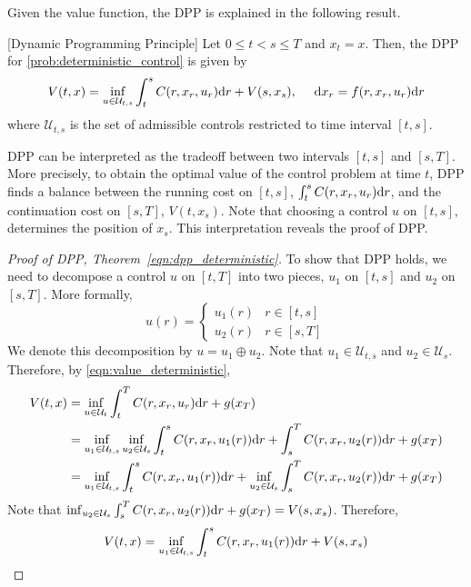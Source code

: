 \documentclass[11pt]{book}
\newcommand{\dr}{\text{\normalfont d}r}
\newcommand{\dx}{\text{\normalfont d}x}
\begin{document}
Given the value function, the DPP is explained in the following result.
\begin{thm}\label{thm:dpp_deterministic}
    [Dynamic Programming Principle]
    Let $0\le t<s\le T$ and $x_t=x$. Then, the DPP for \eqref{prob:deterministic_control} is given by 
    \begin{equation} \label{eqn:dpp_deterministic}
    V(t,x) =\inf_{u\in\mathcal{U}_{t,s}}\int_t^sC(r,x_r,u_r){{\dr}}+V(s,x_s),~~~~{\dx}_r=f(r,x_r,u_r){{\dr}}
\end{equation}
where $\mathcal{U}_{t,s}$ is the set of admissible controls restricted to time interval $[t,s]$.
\end{thm}
DPP can be interpreted as the tradeoff between two intervals $[t,s]$ and $[s,T]$. More precisely, to obtain the optimal value of the control problem at time $t$, DPP finds a balance between the running cost on $[t,s]$, $\int_t^sC(r,x_r,u_r){{\dr}}$, and the continuation cost on $[s,T]$, $V(t,x_s)$. Note that choosing a control $u$ on $[t,s]$, determines the position of $x_s$.
This interpretation reveals the proof of DPP.
\begin{proof}
    [Proof of DPP, Theorem~\ref{eqn:dpp_deterministic}]
    To show that DPP holds, we need to decompose a control $u$ on $[t,T]$ into two pieces, $u_1$ on $[t,s]$ and $u_2$ on $[s,T]$. More formally,
    \[
    u(r) =\begin{cases}
        u_1(r)& r\in[t,s]\\
        u_2(r)& r\in[s,T]
    \end{cases} 
    \]
    We denote this decomposition by $u=u_1\oplus u_2$. Note that $u_1\in\mathcal{U}_{t,s}$ and $u_2\in\mathcal{U}_{s}$.
    Therefore, by \eqref{eqn:value_deterministic},
    \[
    \begin{split}
        V(t,x)&= \inf_{u\in\mathcal{U}_{t}}\int_t^TC(r,x_r,u_r){{\dr}}+g(x_T)\\
        &= \inf_{u_1\in\mathcal{U}_{t,s}}\inf_{u_2\in\mathcal{U}_{s}}\int_t^sC(r,x_r,u_1(r)){{\dr}}+\int_s^TC(r,x_r,u_2(r)){{\dr}}+g(x_T)\\
        &=
        \inf_{u_1\in\mathcal{U}_{t,s}} \int_t^sC(r,x_r,u_1(r)){{\dr}} + \inf_{u_2\in\mathcal{U}_{s}}\int_s^TC(r,x_r,u_2(r)){{\dr}}+g(x_T)\\
    \end{split}
    \]
    Note that $\inf_{u_2\in\mathcal{U}_{s}}\int_s^TC(r,x_r,u_2(r)){{\dr}}+g(x_T)=V(s,x_s)$. Therefore,
     \[
        V(t,x)= 
        \inf_{u_1\in\mathcal{U}_{t,s}} \int_t^sC(r,x_r,u_1(r)){{\dr}} + V(s,x_s)
    \]
\end{proof}
\end{document}
